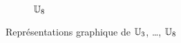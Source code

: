 \begin{figure}
\begin{subfigure}{.3\textwidth}
                          \caption{$\mathbb{U}_8$}
                          \label{fig:U8}      
                        \end{subfigure}
                        \caption{Représentations graphique de $\mathbb{U}_3$, \ldots, $\mathbb{U}_{8}$}
                        \label{fig:racinesnieme}
                      \end{figure}


